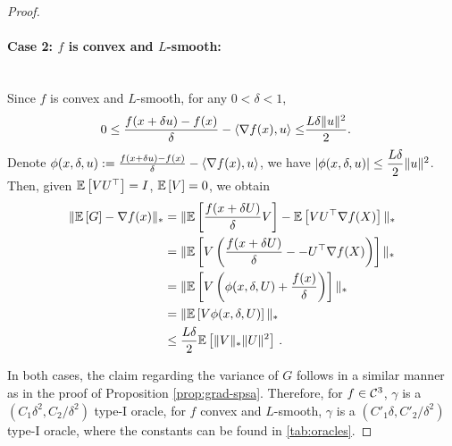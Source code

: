 \begin{proof}
\paragraph{Case 2: $f$ is convex and $L$-smooth:}\ \\
Since $f$ is convex and $L$-smooth, for any $0<\delta <1$,
\begin{align*}
 0 \le \frac{f(x + \delta u)-f(x)}{\delta}-\left\langle\nabla f(x), u\right\rangle \le&   \frac{L \delta \| u\|^2}{2}.
\end{align*}
Denote
$\phi(x,\delta,u):=\frac{f(x + \delta u)-f(x)}{\delta}-\left\langle\nabla f(x), u\right\rangle$, we have
$\left|\phi(x,\delta,u) \right| \le  \dfrac{L\delta}{2} \|u\|^2$.
Then,  given $\mathbb{E}\left[VU^\top\right]=I$, $\mathbb{E}\left[V\right]=0$, we obtain
\begin{align*}
\| \mathbb{E}\left[ G \right] - \nabla f(x) \|_* 
&= \| \mathbb{E}\left[\frac{f(x + \delta U)}{\delta}V\right]-\mathbb{E}\left[VU^\top \nabla f(X)\right]  \|_*\\
&=\| \mathbb{E}\left[V\left( \frac{f(x + \delta U)}{\delta}- -U^\top \nabla f(X)\right)\right]  \|_*\\
&= \| \mathbb{E}\left[V\left( \phi(x,\delta,U)+\dfrac{f(x)}{\delta} \right)\right]  \|_*\\
&=\| \mathbb{E}\left[V\phi(x,\delta,U)\right] \|_*\\
&\le \dfrac{L\delta}{2}\mathbb{E}\left[\|V\|_*\|U\|^2\right]\,.
\end{align*}

In both cases, the claim regarding the variance of $G$ follows in a similar manner as in the proof of Proposition \ref{prop:grad-spsa}.
Therefore, for $f \in \mathcal{C}^3$, $\gamma$ is a $(C_1\delta^2, C_2/\delta^2)$ type-I oracle, for $f$ convex and $L$-smooth, $\gamma$ is a $(C'_1\delta, C'_2/\delta^2)$ type-I oracle, where the constants can be found in \cref{tab:oracles}.


\end{proof}
